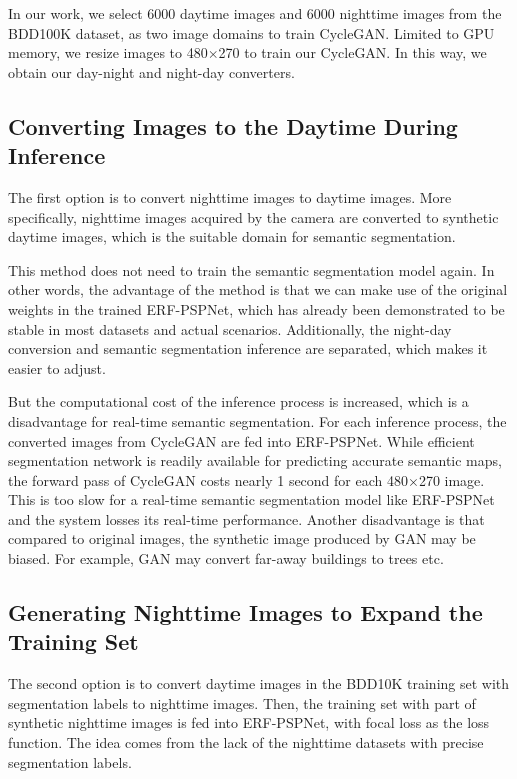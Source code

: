 \documentclass[a4paper]{spie}
\begin{document}
In our work, we select 6000 daytime images and 6000 nighttime images from the BDD100K dataset\cite{yu2018bdd100k}, as two image domains to train CycleGAN. Limited to GPU memory, we resize images to 480$\times$270 to train our CycleGAN. In this way, we obtain our day-night and night-day converters.


\subsection{Converting Images to the Daytime During Inference}

The first option is to convert nighttime images to daytime images. More specifically, nighttime images acquired by the camera are converted to synthetic daytime images, which is the suitable domain for semantic segmentation. 

This method does not need to train the semantic segmentation model again. In other words, the advantage of the method is that we can make use of the original weights in the trained ERF-PSPNet, which has already been demonstrated to be stable in most datasets\cite{xiang2019importance} and actual scenarios\cite{yang2019can,yang2019robustifying}. Additionally, the night-day conversion and semantic segmentation inference are separated, which makes it easier to adjust.

But the computational cost of the inference process is increased, which is a disadvantage for real-time semantic segmentation. For each inference process, the converted images from CycleGAN are fed into ERF-PSPNet. While efficient segmentation network is readily available for predicting accurate semantic maps, the forward pass of CycleGAN costs nearly 1 second for each 480$\times$270 image. This is too slow for a real-time semantic segmentation model like ERF-PSPNet and the system losses its real-time performance. Another disadvantage is that compared to original images, the synthetic image produced by GAN may be biased. For example, GAN may convert far-away buildings to trees etc.

\subsection{Generating Nighttime Images to Expand the Training Set}

The second option is to convert daytime images in the BDD10K training set with segmentation labels to nighttime images. Then, the training set with part of synthetic nighttime images is fed into ERF-PSPNet, with focal loss as the loss function\cite{lin2017focal,yang2018predicting}. The idea comes from the lack of the nighttime datasets with precise segmentation labels. 
\end{document}
